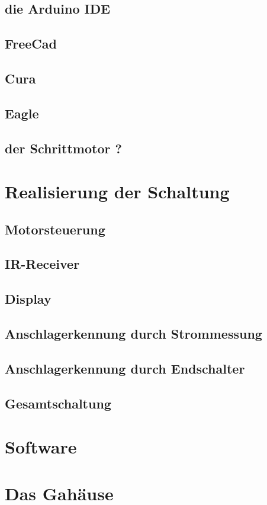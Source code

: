 \documentclass[11pt, titlepage, fleqn]{report}
\begin{document}
			\subsection{die Arduino IDE}
			\subsection{FreeCad}
			\subsection{Cura}
			\subsection{Eagle}
			\subsection{der Schrittmotor ?}
		\section{Realisierung der Schaltung}
			\subsection{Motorsteuerung}
			\subsection{IR-Receiver}
			\subsection{Display}
			\subsection{Anschlagerkennung durch Strommessung}
			\subsection{Anschlagerkennung durch Endschalter}
			\subsection{Gesamtschaltung}
		\section{Software}
		\section{Das Gahäuse}
\end{document}
